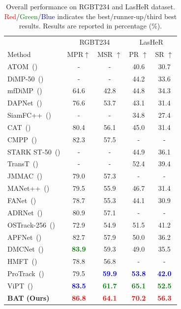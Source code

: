 \documentclass[letterpaper]{article} %
\begin{document}
\begin{table}[th]
\label{tabresults}
\renewcommand{\arraystretch}{1}
\setlength{\tabcolsep}{6pt}
\caption{Overall performance on RGBT234 and LasHeR dataset. \textcolor{red}{Red}/\textcolor{green}{Green}/\textcolor{blue}{Blue} indicates the best/runner-up/third best results. Results are reported in percentage (\%).}
\label{tab:comparison}
\centering
{
\begin{tabular}{lcccc}
\toprule
&\multicolumn{2}{c}{RGBT234} &\multicolumn{2}{c}{LasHeR} \\
Method&MPR$\uparrow$&MSR $\uparrow$&PR $\uparrow$&SR $\uparrow$ \\
\midrule
ATOM~(\citeyear{atom})&-&-&40.6&30.7 \\
DiMP-50~(\citeyear{dimp50})&-&-&44.2&33.6 \\
mfDiMP~(\citeyear{mfDimp})&64.6&42.8&44.8&34.3 \\
DAPNet~(\citeyear{DAPNet})&76.6&53.7&43.1&31.4 \\
SiamFC++~(\citeyear{siamfc++})&-&-&34.8&27.4 \\
CAT~(\citeyear{CAT})&80.4&56.1&45.0&31.4 \\
CMPP~(\citeyear{CMPP})&82.3&57.5&-&- \\
STARK ST-50~(\citeyear{stark})&-&-&44.9&36.1 \\
TransT~(\citeyear{transt})&-&-&52.4&39.4  \\
JMMAC~(\citeyear{JMMC})&79.0&57.3&-&- \\
MANet++~(\citeyear{MANet++})&79.5&55.9&46.7&31.4 \\
FANet~(\citeyear{FANet})&78.7&55.3&44.1&30.9 \\
ADRNet~(\citeyear{ADRNet})&80.9&57.1&-&- \\
OSTrack-256~(\citeyear{ye2022joint})&72.9&54.9&51.5&41.2 \\
APFNet~(\citeyear{APFNet})&82.7&57.9&50.0&36.2 \\
DMCNet~(\citeyear{DMCNet})&\textbf{\textcolor{green}{83.9}}&59.3&49.0&35.5 \\
HMFT~(\citeyear{HMFT})&78.8&56.8&-&- \\
\midrule
ProTrack~(\citeyear{ProTrack})&79.5&\textbf{\textcolor{blue}{59.9}}&\textbf{\textcolor{blue}{53.8}}&\textbf{\textcolor{blue}{42.0}} \\
ViPT~(\citeyear{zhu2023visual})&\textbf{\textcolor{blue}{83.5}}&\textbf{\textcolor{green}{61.7}}&\textbf{\textcolor{green}{65.1}}&\textbf{\textcolor{green}{52.5}} \\
\midrule
\textbf{BAT (Ours)}&\textbf{\textcolor{red}{86.8}}&\textbf{\textcolor{red}{64.1}}&\textbf{\textcolor{red}{70.2}}&\textbf{\textcolor{red}{56.3}} \\
\bottomrule
\end{tabular}
}
\end{table}
\end{document}
